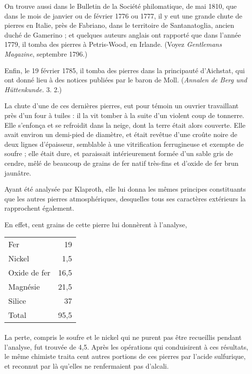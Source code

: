 \documentclass[a4paper, 12pt, oneside, french]{article}
\begin{document}
On trouve aussi dans le Bulletin de la Société philomatique, de mai 1810, que dans le mois de janvier ou de février 1776 ou 1777, il y eut une grande chute de pierres en Italie, près de Fabriano, dans le territoire de Santanatoglia, ancien duché de Gamerino ; et quelques auteurs anglais ont rapporté que dans l'année 1779, il tomba des pierres à Petris-Wood, en Irlande. (Voyez \emph{Gentlemans Magazine}, septembre 1796.)

Enfin, le 19 février 1785, il tomba des pierres dans la principauté d'Aichstat, qui ont donné lieu à des notices publiées par le baron de Moll. (\emph{Annalen de Berg und Hüttenkunde.} 3. 2.)

La chute d'une de ces dernières pierres, eut pour témoin un ouvrier travaillant près d'un four à tuiles : il la vit tomber à la suite d'un violent coup de tonnerre. Elle s'enfonça et se refroidit dans la neige, dont la terre était alors couverte. Elle avait environ un demi-pied de diamètre, et était revêtue d'une croûte noire de deux lignes d'épaisseur, semblable à une vitrification ferrugineuse et exempte de soufre ; elle était dure, et paraissait intérieurement formée d'un sable gris de cendre, mêlé de beaucoup de grains de fer natif très-fins et d'oxide de fer brun jaunâtre.

Ayant été analysée par Klaproth, elle lui donna les mêmes principes constituants que les autres pierres atmosphériques, desquelles tous ses caractères extérieurs la rapprochent également.

En effet, cent grains de cette pierre lui donnèrent à l'analyse,
\begin{table}[H]
    \centering
    \Fontauri
    \large
    \begin{tabular}{l r}
        Fer & 19 \\
        Nickel & 1,5 \\
        Oxide de fer & 16,5 \\
        Magnésie & 21,5 \\
        Silice & 37 \\ \hline
        Total & 95,5 \\
    \end{tabular}
\end{table}
\paragraph{}
La perte, compris le soufre et le nickel qui ne purent pas être recueillis pendant l'analyse, fut trouvée de 4,5. Après les opérations qui conduisirent à ces résultats, le même chimiste traita cent autres portions de ces pierres par l'acide sulfurique, et reconnut par là qu'elles ne renfermaient pas d'alcali.
\end{document}

